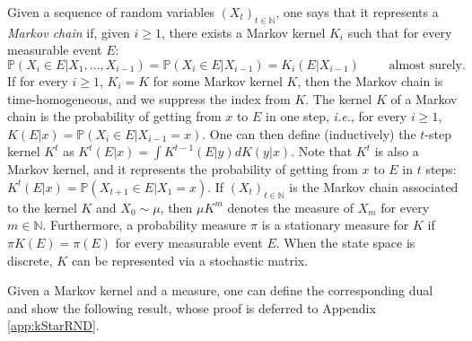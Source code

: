 \documentclass[11pt]{article}
\theoremstyle{plain}
\theoremstyle{remark}
\begin{document}
    Given a sequence of random variables $(X_t)_{t\in\mathbb{N}}$, one says that it represents a \emph{Markov chain} if, given $i\geq 1$,  there exists a Markov kernel $K_i$ such that for every measurable event $E$: 
    \begin{equation}
        \mathbb{P}(X_i \in E | X_1,\ldots,X_{i-1}) = \mathbb{P}(X_i \in E | X_{i-1}) = K_i(E|X_{i-1})\qquad  \text{ almost surely}.
    \end{equation}
    If for every $i\geq 1$, $K_i = K$ for some Markov kernel $K$, then the Markov chain is time-homogeneous, and we suppress the index from $K$. %
    The kernel $K$ of a Markov chain is the probability of getting from $x$ to $E$ in one step, \textit{i.e.}, for every $i\geq 1$, 
    $K(E|x) = \mathbb{P}(X_i \in E| X_{i-1}=x)$. One can then define (inductively) the $t$-step %
    kernel $K^t$ as
     $   K^t(E|x) = \int K^{t-1}(E|y)dK(y|x)$.
    Note that $K^t$ is also a Markov kernel, and it represents the probability of getting from $x$ to $E$ in $t$ steps: $K^t(E|x)= \mathbb{P}(X_{t+1}\in E|X_{1}=x)$.
    If $(X_t)_{t\in\mathbb{N}}$ is the Markov chain associated to the kernel $K$ and $X_0 \sim \mu$, then $\mu K^m$ denotes the measure of $X_{m}$ for every $m\in \mathbb{N}$. Furthermore, a probability measure $\pi$ is a stationary measure for $K$ if $\pi K(E) = \pi(E)$ for every measurable event $E$. When the state space is discrete, $K$ can be represented via a stochastic matrix.

Given a Markov kernel and a measure, one can define the corresponding dual~\citep{contractionLedoux} and show the following result, whose proof is deferred to %
Appendix \ref{app:kStarRND}.
    
\end{document}

